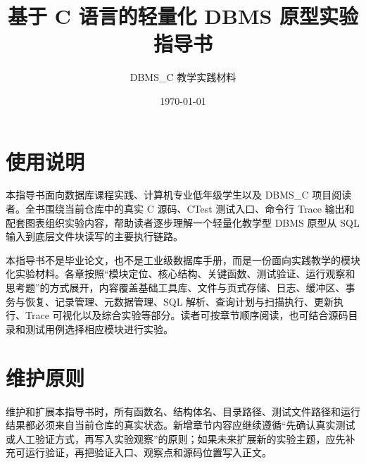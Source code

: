 \documentclass[UTF8,zihao=-4,openany]{ctexbook}
\title{基于 C 语言的轻量化 DBMS 原型实验指导书}
\author{DBMS\_C 教学实践材料}
\date{\today}
\begin{document}
\frontmatter
\maketitle

\chapter*{使用说明}
本指导书面向数据库课程实践、计算机专业低年级学生以及 DBMS\_C 项目阅读者。全书围绕当前仓库中的真实 C 源码、CTest 测试入口、命令行 Trace 输出和配套图表组织实验内容，帮助读者逐步理解一个轻量化教学型 DBMS 原型从 SQL 输入到底层文件块读写的主要执行链路。

本指导书不是毕业论文，也不是工业级数据库手册，而是一份面向实践教学的模块化实验材料。各章按照“模块定位、核心结构、关键函数、测试验证、运行观察和思考题”的方式展开，内容覆盖基础工具库、文件与页式存储、日志、缓冲区、事务与恢复、记录管理、元数据管理、SQL 解析、查询计划与扫描执行、更新执行、Trace 可视化以及综合实验等部分。读者可按章节顺序阅读，也可结合源码目录和测试用例选择相应模块进行实验。

\tableofcontents

\mainmatter
\setcounter{chapter}{-1}














\backmatter
\chapter*{维护原则}
维护和扩展本指导书时，所有函数名、结构体名、目录路径、测试文件路径和运行结果都必须来自当前仓库的真实状态。新增章节内容应继续遵循“先确认真实测试或人工验证方式，再写入实验观察”的原则；如果未来扩展新的实验主题，应先补充可运行验证，再把验证入口、观察点和源码位置写入正文。
\end{document}

